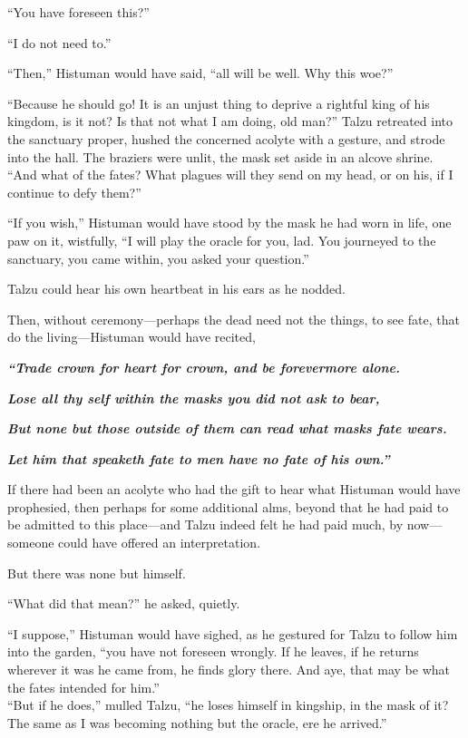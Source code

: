 ``You have foreseen this?''

``I do not need to.''

``Then,'' Histuman would have said, ``all will be well. Why this woe?''

``Because he should go! It is an unjust thing to deprive a rightful king of his kingdom, is it not? Is that not what I am doing, old man?'' Talzu retreated into the sanctuary proper, hushed the concerned acolyte with a gesture, and strode into the hall. The braziers were unlit, the mask set aside in an alcove shrine. ``And what of the fates? What plagues will they send on my head, or on his, if I continue to defy them?''

``If you wish,'' Histuman would have stood by the mask he had worn in life, one paw on it, wistfully, ``I will play the oracle for you, lad. You journeyed to the sanctuary, you came within, you asked your question.''

Talzu could hear his own heartbeat in his ears as he nodded.

Then, without ceremony---perhaps the dead need not the things, to see fate, that do the living---Histuman would have recited,

\emph{\textbf{``Trade crown for heart for crown, and be forevermore alone.}}

\emph{\textbf{Lose all thy self within the masks you did not ask to bear,}}

\emph{\textbf{But none but those outside of them can read what masks fate wears.}}

\emph{\textbf{Let him that speaketh fate to men have no fate of his own.''}}

If there had been an acolyte who had the gift to hear what Histuman would have prophesied, then perhaps for some additional alms, beyond that he had paid to be admitted to this place---and Talzu indeed felt he had paid much, by now---someone could have offered an interpretation.

But there was none but himself.

``What did that mean?'' he asked, quietly.

``I suppose,'' Histuman would have sighed, as he gestured for Talzu to follow him into the garden, ``you have not foreseen wrongly. If he leaves, if he returns wherever it was he came from, he finds glory there. And aye, that may be what the fates intended for him.''\\
``But if he does,'' mulled Talzu, ``he loses himself in kingship, in the mask of it? The same as I was becoming nothing but the oracle, ere he arrived.''

